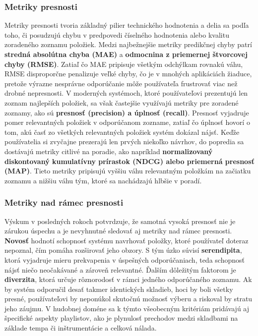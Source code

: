 \subsubsection{Metriky presnosti}
Metriky presnosti tvoria základný pilier technického hodnotenia a delia sa podľa toho, či posudzujú chybu v predpovedi číselného hodnotenia alebo kvalitu zoradeného zoznamu položiek. \cite{Aggarwal}
Medzi najbežnejšie metriky predikčnej chyby patrí \textbf{stredná absolútna chyba (MAE) } a \textbf{odmocnina z priemernej štvorcovej chyby (RMSE)}. Zatiaľ čo MAE pripisuje všetkým odchýlkam rovnakú váhu, RMSE disproporčne penalizuje veľké chyby, čo je v mnohých aplikáciách žiaduce, pretože výrazne nesprávne odporúčanie môže používateľa frustrovať viac než drobné nepresnosti. \cite{challenges, Ricci}
V moderných systémoch, ktoré používateľovi prezentujú len zoznam najlepších položiek, sa však častejšie využívajú metriky pre zoradené zoznamy, ako sú \textbf{presnosť (precision) a úplnosť (recall)}. Presnosť vyjadruje pomer relevantných položiek v odporúčanom zozname, zatiaľ čo úplnosť hovorí o tom, akú časť zo všetkých relevantných položiek systém dokázal nájsť. \cite{challenges}
Keďže používatelia si zvyčajne prezerajú len prvých niekoľko návrhov, do popredia sa dostávajú metriky citlivé na poradie, ako napríklad \textbf{normalizovaný diskontovaný kumulatívny prírastok (NDCG) alebo priemerná presnosť (MAP)}. Tieto metriky pripisujú vyššiu váhu relevantným položkám na začiatku zoznamu a nižšiu váhu tým, ktoré sa nachádzajú hlbšie v poradí. \cite{challenges, Ricci}

\subsubsection{Metriky nad rámec presnosti}
Výskum v posledných rokoch potvrdzuje, že samotná vysoká presnosť nie je zárukou úspechu a je nevyhnutné sledovať aj metriky nad rámec presnosti. \cite{Ricci, 72vRicci(asi Knij :D)}
\textbf{Novosť} hodnotí schopnosť systému navrhovať položky, ktoré používateľ doteraz nepoznal, čím pomáha rozširovať jeho obzory. \cite{1vchallenges, 41vRicci} S tým úzko súvisí \textbf{serendipita}, ktorá vyjadruje mieru prekvapenia v úspešných odporúčaniach, teda schopnosť nájsť niečo neočakávané a zároveň relevantné. \cite{challenges, Ricci} Ďalším dôležitým faktorom je \textbf{diverzita}, ktorá určuje rôznorodosť v rámci jedného odporúčaného zoznamu. \cite{challenges, Ricci} Ak by systém odporučil desať takmer identických skladieb, hoci by boli všetky presné, používateľovi by neponúkol skutočnú možnosť výberu a riskoval by stratu jeho záujmu. 
V hudobnej doméne sa k týmto všeobecným kritériám pridávajú aj špecifické aspekty playlistov, ako je plynulosť prechodov medzi skladbami na základe tempa či inštrumentácie a celková nálada. \cite{survey, challenges}

